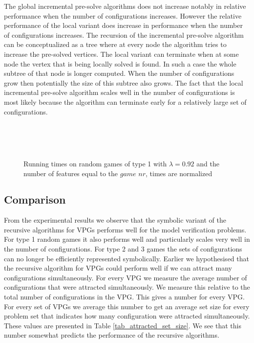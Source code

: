 The global incremental pre-solve algorithms does not increase notably in relative performance when the number of configurations increases. However the relative performance of the local variant does increase in performance when the number of configurations increases. The recursion of the incremental pre-solve algorithm can be conceptualized as a tree where at every node the algorithm tries to increase the pre-solved vertices. The local variant can terminate when at some node the vertex that is being locally solved is found. In such a case the whole subtree of that node is longer computed. When the number of configurations grow then potentially the size of this subtree also grows. The fact that the local incremental pre-solve algorithm scales well in the number of configurations is most likely because the algorithm can terminate early for a relatively large set of configurations.

\begin{figure}[H]
	\centering
	\begin{multicols}{2}
		\\\vfill
		\\
		\\\vfill
		
	\end{multicols}
	\caption{Running times on random games of type 1 with $\lambda = 0.92$ and the number of features equal to the $\textit{game nr}$, times are normalized}
	\label{fig:results_scalegames}
\end{figure}%

\subsection{Comparison}
From the experimental results we observe that the symbolic variant of the recursive algorithms for VPGs performs well for the model verification problems. For type 1 random games it also performs well and particularly scales very well in the number of configurations. For type 2 and 3 games the sets of configurations can no longer be efficiently represented symbolically. Earlier we hypothesised that the recursive algorithm for VPGs could perform well if we can attract many configurations simultaneously. For every VPG we measure the average number of configurations that were attracted simultaneously. We measure this relative to the total number of configurations in the VPG. This gives a number for every VPG. For every set of VPGs we average this number to get an average set size for every problem set that indicates how many configuration were attracted simultaneously. These values are presented in Table \ref{tab_attracted_set_size}. We see that this number somewhat predicts the performance of the recursive algorithms.

